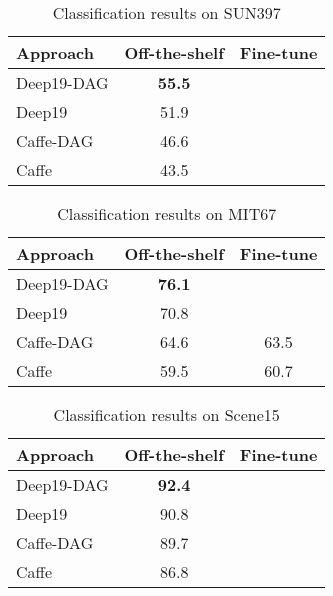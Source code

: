 \documentclass[10pt,twocolumn,letterpaper]{article}
\begin{document}
\begin{table}[htbp]
\begin{center}
\begin{tabular}{|l|c|c|}
\hline
Approach & Off-the-shelf &  Fine-tune\\
\hline
Deep19-DAG & \textbf{55.5} &  \\
Deep19~\cite{veryDeep} & 51.9 &  \\
Caffe-DAG & 46.6	& \\
Caffe~\cite{Caffe} & 43.5 &  \\ \hline

\hline
\end{tabular}
\end{center}
\caption{Classification results on SUN397}
\label{table:SUN397}
\end{table}



\begin{table}[htbp]
\begin{center}
\begin{tabular}{|l|c|c|}
\hline
Approach & Off-the-shelf &  Fine-tune\\
\hline
Deep19-DAG & \textbf{76.1} &  \\
Deep19~\cite{veryDeep} & 70.8 &  \\
Caffe-DAG & 64.6	& 63.5\\
Caffe~\cite{Caffe} & 59.5 & 60.7 \\ \hline

\hline
\end{tabular}
\end{center}
\caption{Classification results on MIT67}
\label{table:MIT67}
\end{table}



\begin{table}[htbp]
\begin{center}
\begin{tabular}{|l|c|c|}
\hline
Approach & Off-the-shelf &  Fine-tune\\
\hline
Deep19-DAG & \textbf{92.4} &  \\
Deep19~\cite{veryDeep} & 90.8 &  \\
Caffe-DAG & 89.7	& \\
Caffe~\cite{Caffe} & 86.8 & \\ \hline

\hline
\end{tabular}
\end{center}
\caption{Classification results on Scene15}
\label{table:Scene15}
\end{table}



{\small


}
\end{document}
